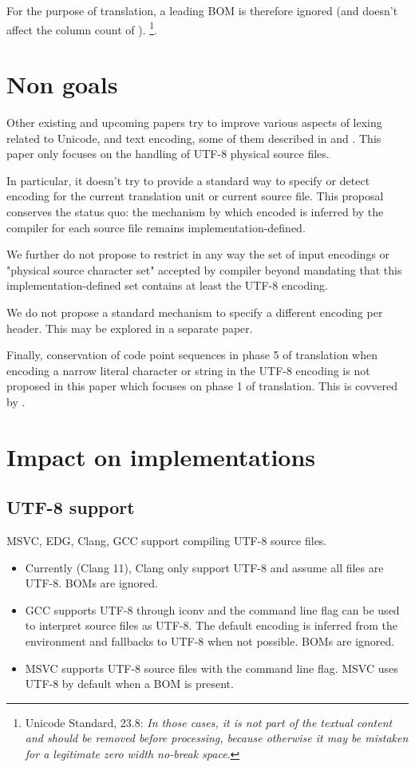 \documentclass{wg21}
\begin{document}
\pagebreak

For the purpose of translation, a leading BOM is therefore ignored (and doesn't affect the column count of ).
\footnote{Unicode Standard, 23.8: \emph{In those cases, it is not part of the textual content and should be removed before processing, because otherwise it may be mistaken for a legitimate zero width no-break space}.}.

\section{Non goals}

Other existing and upcoming papers try to improve various aspects of lexing related to Unicode, and text encoding, some of them described in 
and .
This paper only focuses on the handling of UTF-8 physical source files.

In particular, it doesn't try to provide a standard  way to specify or detect encoding for the current translation unit or current source file. This proposal conserves the status quo: the mechanism by which encoded is inferred by the compiler for each source file remains implementation-defined.

We further do not propose to restrict in any way the set of input encodings or "physical source character set"
accepted by compiler beyond mandating that this implementation-defined set contains at least the UTF-8 encoding.

We do not propose a standard mechanism to specify a different encoding per header. This may be explored in a separate paper.

Finally, conservation of code point sequences in phase 5 of translation when encoding a narrow literal character or string in the UTF-8
encoding is not proposed in this paper which focuses on phase 1 of translation.
This is covvered by .




\section{Impact on implementations}

\subsection{UTF-8 support}
MSVC, EDG, Clang, GCC support compiling UTF-8 source files.

\begin{itemize}
\item Currently (Clang 11), Clang only support UTF-8 and assume all files are UTF-8. BOMs are ignored.
\item GCC supports UTF-8 through iconv and the command line flag  can be used to interpret source files as UTF-8.
The default encoding is inferred from the environment and fallbacks to UTF-8 when not possible. BOMs are ignored.
\item MSVC supports UTF-8 source files with the  command line flag. MSVC uses UTF-8 by default when a BOM is present.
\end{itemize}
\end{document}
